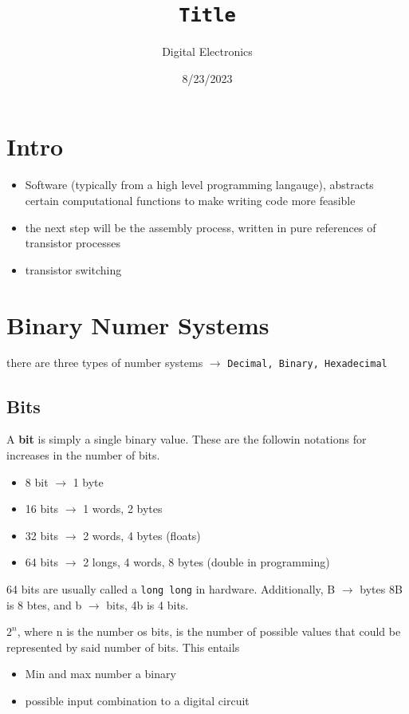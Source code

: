 \documentclass[a4paper,12pt]{article}
\title{\texttt{Title}\\\hrulefill}
\author{Digital Electronics}
\date{8/23/2023}
\begin{document}
    \maketitle

    \section*{Intro}
    
    \begin{itemize}
        \item Software (typically from a high level programming langauge), abstracts certain computational functions to make writing code more feasible
        \item the next step will be the assembly process, written in pure references of transistor processes
        \item transistor switching 
    \end{itemize}
    \section*{Binary Numer Systems}
    there are three types of number systems $\rightarrow$ \texttt{Decimal, Binary, Hexadecimal}

    \subsection*{Bits}
        A \textbf{bit} is simply a single binary value. These are the followin notations for increases in the number of bits.
        \begin{itemize}
            \item 8 bit $\rightarrow$ 1 byte
            \item 16 bits $\rightarrow$ 1 words, 2 bytes
            \item 32 bits $\rightarrow$ 2 words, 4 bytes (floats)
            \item 64 bits $\rightarrow$ 2 longs, 4 words, 8 bytes (double in programming)
        \end{itemize}
        64 bits are usually called a \texttt{long long} in hardware. Additionally, B $\rightarrow$ bytes 8B is 8 btes, and b $\rightarrow$ bits, 4b is 4 bits.
        \par $2^n$, where n is the number os bits, is the number of possible values that could be represented by said number of bits. This entails
        \begin{itemize}
            \item Min and max number a binary 
            \item possible input combination to a digital circuit
        \end{itemize}
\end{document}
